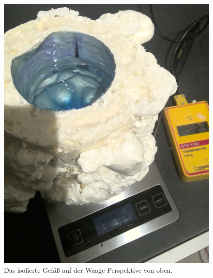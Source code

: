 \documentclass[11pt, ngerman]{scrartcl}
\begin{document}
\begin{figure}[H]
	\centering
	\begin{minipage}[t]{.33\linewidth} %
		\includegraphics[width=\linewidth]{pics/Aufbau (1).jpg}
		\caption[Aufbau isoliertes Gefäß auf der Waage (Oben)]{Das isolierte Gefäß
			auf der Waage Perspektive von oben.}
		\label{fig:waageaufbau1}
	\end{minipage}
	\begin{minipage}[t]{.33\linewidth} %

\end{minipage}
\end{figure}
\end{document}
